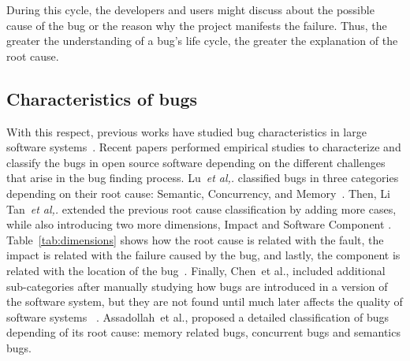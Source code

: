 \documentclass[a4paper, 12pt]{book}
\begin{document}
During this cycle, the developers and users might discuss about the possible cause of the bug or the reason why the project manifests the failure. Thus, the greater the understanding of a bug's life cycle, the greater the explanation of the root cause.

\subsection{Characteristics of bugs}

With this respect, previous works have studied bug characteristics in large software systems~\cite{chou2001empirical,gu2003characterization,ostrand1984collecting,ostrand2002distribution,podgurski2003automated, sullivan1992comparison,chen2014empirical,li2006have,beizer2003software,tan2014bug}. Recent papers  performed empirical studies to characterize and classify the bugs in open source software depending on the different challenges that arise in the bug finding process. Lu~\emph{et al,.} classified bugs in three categories depending on their root cause: Semantic, Concurrency, and Memory~\cite{lu2005bugbench}. Then, Li Tan~\emph{et al,.} extended the previous root cause classification by adding more cases, while also introducing two more dimensions, Impact and Software Component \cite{tan2014bug}. Table~\ref{tab:dimensions} shows how the root cause is related with the fault, the impact is related with the failure caused by the bug, and lastly, the component is related with the location of the bug~\cite{li2006have}. Finally, Chen~{et al.,} included additional sub-categories after manually studying how bugs  are introduced in a version of the software system, but they are not found until much later affects the quality of software systems ~\cite{chen2014empirical}. Assadollah~{et al.,} proposed a detailed classification of bugs depending of its root cause: memory related bugs, concurrent bugs and semantics bugs.


\end{document}
